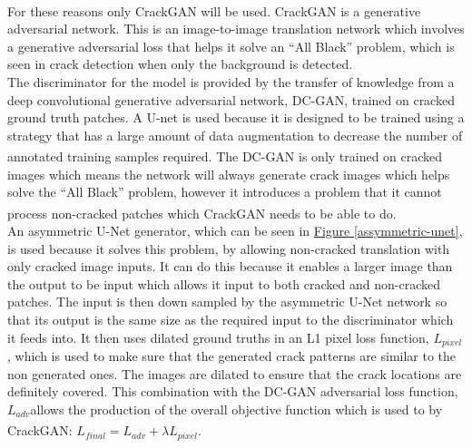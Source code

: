 \documentclass[11pt]{article}		%
\newcommand{\supercite}[1]{\textsuperscript{\cite{#1}}}		%
\newcommand{\figref}[1]{\hyperref[#1]{Figure \ref*{#1}}}    %
\begin{document}
            \begin{floatingfigure}[r]{0pt} \end{floatingfigure}
            \hspace*{3ex}For these reasons only CrackGAN will be used.\supercite{CrackGAN1} 
            CrackGAN is a generative adversarial network. This is an image-to-image translation network which involves a generative adversarial loss that helps it solve an “All Black” problem, which is seen in crack detection when only the background is detected. \\
            The discriminator for the model is provided by the transfer of knowledge from a deep convolutional generative adversarial network, DC-GAN, trained on cracked ground truth patches. A U-net is used because it is designed to be trained using a strategy that has a large amount of data augmentation to decrease the number of annotated training samples required.\supercite{U-Net} The DC-GAN is only trained on cracked images which means the network will always generate crack images which helps solve the “All Black” problem, however it introduces a problem that it cannot process non-cracked patches which CrackGAN needs to be able to do. \supercite{CrackGAN1}
            \\
            \hspace*{3ex}An asymmetric U-Net generator, which can be seen in \figref{assymmetric-unet}, is used because it solves this problem, by allowing non-cracked translation with only cracked image inputs. It can do this because it enables a larger image than the output to be input which allows it input to both cracked and non-cracked patches. The input is then down sampled by the asymmetric U-Net network so that its output is the same size as the required input to the discriminator which it feeds into. It then uses dilated ground truths in an L1 pixel loss function, $L_{pixel}$, which is used to make sure that the generated crack patterns are similar to the non generated ones. The images are dilated to ensure that the crack locations are definitely covered. This combination with the DC-GAN adversarial loss function, $L_{adv}$allows the production of the overall objective function which is used to by CrackGAN: $L_{final}=L_{adv}+\lambda L_{pixel}$.\supercite{CrackGAN1} 
			
\end{document}
